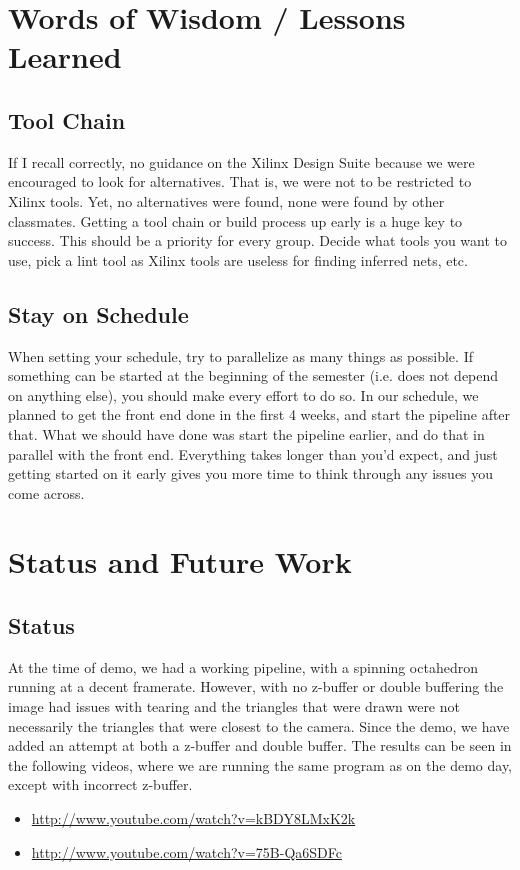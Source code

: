 \documentclass[letterpaper,10pt]{article}
\begin{document}
\section{Words of Wisdom / Lessons Learned}

\subsection{Tool Chain}
If I recall correctly, no guidance on the Xilinx Design Suite because we were encouraged to look for alternatives.  That is, we were not to be restricted to Xilinx tools.  Yet, no alternatives were found, none were found by other classmates.  Getting a tool chain or build process up early is a huge key to success.  This should be a priority for every group. Decide what tools you want to use, pick a lint tool as Xilinx tools are useless for finding inferred nets, etc.

\subsection{Stay on Schedule}
When setting your schedule, try to parallelize as many things as possible. If something can be started at the beginning of the semester (i.e. does not depend on anything else), you should make every effort to do so. In our schedule, we planned to get the front end done in the first 4 weeks, and start the pipeline after that. What we should have done was start the pipeline earlier, and do that in parallel with the front end. Everything takes longer than you'd expect, and just getting started on it early gives you more time to think through any issues you come across.

\section{Status and Future Work}

\subsection{Status}
At the time of demo, we had a working pipeline, with a spinning octahedron running at a decent framerate. However, with no z-buffer or double buffering the image had issues with tearing and the triangles that were drawn were not necessarily the triangles that were closest to the camera. 
Since the demo, we have added an attempt at both a z-buffer and double buffer. The results can be seen in the following videos, where we are running the same program as on the demo day, except with incorrect z-buffer. 
\begin{itemize}

\item \url{http://www.youtube.com/watch?v=kBDY8LMxK2k}

\item \url{http://www.youtube.com/watch?v=75B-Qa6SDFc} 

\end{itemize}
\end{document}
